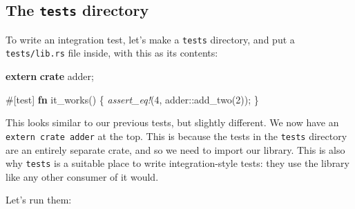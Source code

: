 \documentclass[a4paper,]{book}
\newenvironment{Shaded}{\begin{snugshade}}{\end{snugshade}}
\newcommand{\KeywordTok}[1]{\textcolor[rgb]{0.13,0.29,0.53}{\textbf{{#1}}}}
\newcommand{\DecValTok}[1]{\textcolor[rgb]{0.00,0.00,0.81}{{#1}}}
\newcommand{\PreprocessorTok}[1]{\textcolor[rgb]{0.56,0.35,0.01}{\textit{{#1}}}}
\newcommand{\AttributeTok}[1]{\textcolor[rgb]{0.77,0.63,0.00}{{#1}}}
\newcommand{\NormalTok}[1]{{#1}}
\begin{document}
\subsection{\texorpdfstring{The \texttt{tests}
directory}{The tests directory}}\label{the-tests-directory}

To write an integration test, let's make a \texttt{tests} directory, and
put a \texttt{tests/lib.rs} file inside, with this as its contents:

\begin{Shaded}
\begin{Highlighting}[]
\KeywordTok{extern} \KeywordTok{crate} \NormalTok{adder;}

\AttributeTok{#[}\NormalTok{test}\AttributeTok{]}
\KeywordTok{fn} \NormalTok{it_works() \{}
    \PreprocessorTok{assert_eq!}\NormalTok{(}\DecValTok{4}\NormalTok{, adder::add_two(}\DecValTok{2}\NormalTok{));}
\NormalTok{\}}
\end{Highlighting}
\end{Shaded}

This looks similar to our previous tests, but slightly different. We now
have an \texttt{extern\ crate\ adder} at the top. This is because the
tests in the \texttt{tests} directory are an entirely separate crate,
and so we need to import our library. This is also why \texttt{tests} is
a suitable place to write integration-style tests: they use the library
like any other consumer of it would.

Let's run them:

\begin{Shaded}
\end{Shaded}
\end{document}
